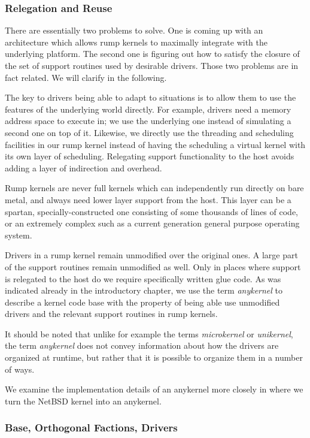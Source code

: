 \subsubsection{Relegation and Reuse}

There are essentially two problems to solve.  One is coming up with an
architecture which allows rump kernels to maximally integrate with the
underlying platform.  The second one is figuring out how to satisfy
the closure of the set of support routines used by desirable drivers.
Those two problems are in fact related.  We will clarify in the following.

The key to drivers being able to adapt to situations is to allow
them to use the features of the underlying world directly.  For
example, drivers need a memory address space to execute in; we use
the underlying one instead of simulating a second one
on top of it.  Likewise, we directly use the threading and
scheduling facilities in our rump kernel instead of having the
scheduling a virtual kernel with its own layer of scheduling.
Relegating support functionality to the host avoids adding a layer of
indirection and overhead.

Rump kernels are never full kernels which can independently run directly on bare
metal, and always need lower layer support from the host.  This layer
can be a spartan, specially-constructed one consisting of some thousands
of lines of code, or an extremely complex such as a current generation
general purpose operating system.

Drivers in a rump kernel remain unmodified over the original ones.
A large part of the support routines remain unmodified as well.
Only in places where support is relegated to the host do we require
specifically written glue code.  As was indicated already in the introductory
chapter, we use the term \textit{anykernel}
to describe a kernel code base with the property of being able use
unmodified drivers and the relevant support routines in rump kernels.

It should be noted that unlike for example the terms \textit{microkernel}
or \textit{unikernel}, the term \textit{anykernel} does not convey
information about how the drivers are organized at runtime, but rather
that it is possible to organize them in a number of ways.

We examine the implementation details of an anykernel more closely
in  where we turn the NetBSD kernel into
an anykernel.


\subsubsection{Base, Orthogonal Factions, Drivers}
\label{sect:conceptintro}

